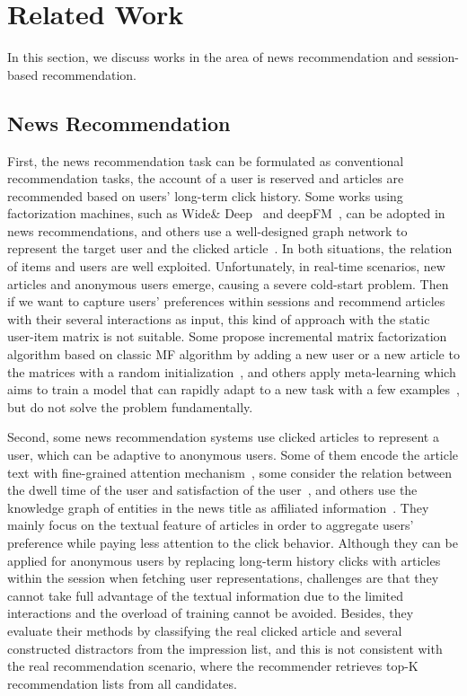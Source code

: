 \section{Related Work}
In this section, we discuss works in the area of news recommendation and session-based
recommendation.

\subsection{News Recommendation}
First, the news recommendation task can be formulated as conventional recommendation tasks, the account of a user is reserved and articles are recommended based on users' long-term click history. Some works using factorization machines, such as Wide\& Deep~\cite{cheng2016wide} and deepFM~\cite{guodeepfm2017}, can be adopted in news recommendations, and others use a well-designed graph network to represent the target user and the clicked article~\cite{hu2020graph,ge2020graph}.
In both situations, the relation of items and users are well exploited. Unfortunately, in real-time scenarios, new articles and anonymous users emerge, causing a severe cold-start problem. Then if we want to capture users' preferences
within sessions and recommend articles with their several interactions as input, this kind of approach with the static user-item matrix is not suitable. Some propose incremental matrix factorization algorithm based on classic MF algorithm by adding a new user or a new article to the matrices with a random initialization~\cite{al2018adaptive}, and others apply meta-learning which aims to train a model that can rapidly adapt to a new task with a few examples~\cite{lee_melu:_2019}, but do not solve the problem fundamentally.

Second, some news recommendation systems use clicked articles to represent a user, which can be adaptive to anonymous users. Some of them encode the article text with fine-grained attention mechanism~\cite{zhu2019dan,wu_neural_2019-1,wu2019npa,wang2020fine}, some consider the relation between the dwell time of the user and satisfaction of the user~\cite{wu2020CPRS}, and others use the knowledge graph of entities in the news title as affiliated information~\cite{wang2018dkn,wang_ripplenet:_2018}. They mainly focus on the textual feature of articles in order to aggregate users' preference while paying less attention to the click behavior. Although they can be applied for anonymous users by replacing long-term history clicks with articles within the session when fetching user representations, challenges are that they cannot take full advantage of the textual information due to the limited interactions and the overload of training cannot be avoided. Besides, they evaluate their methods by classifying the real clicked article and several constructed distractors from the impression list, and this is not consistent with the real recommendation scenario, where the recommender retrieves top-K recommendation lists from all candidates.

